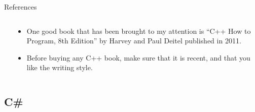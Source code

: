 \documentclass[smaller,handout,table]{beamer}
\begin{document}
\begin{frame}
\begin{exampleblock}{References}
\begin{columns}
\begin{column}{1.7cm}
\end{column}
\begin{column}{8cm}
\begin{itemize}
\item One good book that has been brought to my attention is ``C++ How to Program, 8th Edition'' by Harvey and Paul Deitel published in 2011.
\item Before buying any C++ book, make sure that it is recent, and that you like the writing style.
\end{itemize}
\end{column}
\end{columns}
\end{exampleblock}
\end{frame}

\subsection{C\#}
\end{document}
